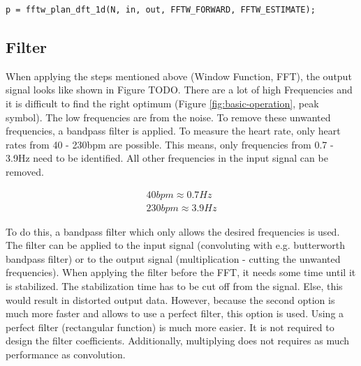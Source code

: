 \documentclass[notitlepage]{scrreprt}
\begin{document}
\begin{lstlisting}
p = fftw_plan_dft_1d(N, in, out, FFTW_FORWARD, FFTW_ESTIMATE);
\end{lstlisting}

\subsection{Filter}
When applying the steps mentioned above (Window Function, FFT), the output signal looks like shown in Figure TODO. There are a lot of high Frequencies and it is difficult to find the right optimum (Figure \ref{fig:basic-operation}, peak symbol). The low frequencies are from the noise. To remove these unwanted frequencies, a bandpass filter is applied. To measure the heart rate, only heart rates from
40 - 230bpm are possible. This means, only frequencies from 0.7 - 3.9Hz need to be identified. All other frequencies in the input signal can be removed.

\begin{equation}
\begin{aligned}
40bpm \approx 0.7Hz\\
230bpm \approx 3.9Hz
\end{aligned}
\end{equation}

To do this, a bandpass filter which only allows the desired frequencies is used. The filter can be applied to the input signal (convoluting with e.g. butterworth bandpass filter) or to the output signal (multiplication - cutting the unwanted frequencies). When applying the filter before the FFT, it needs some time until it is stabilized. The stabilization time has to be cut off from the signal. Else, this would result in distorted output data. However, because the second option is much more faster and allows to use a perfect filter, this option is used. Using a perfect filter (rectangular function) is much more easier. It is not required to design the filter coefficients. Additionally, multiplying does not requires as much performance as convolution.
\end{document}
